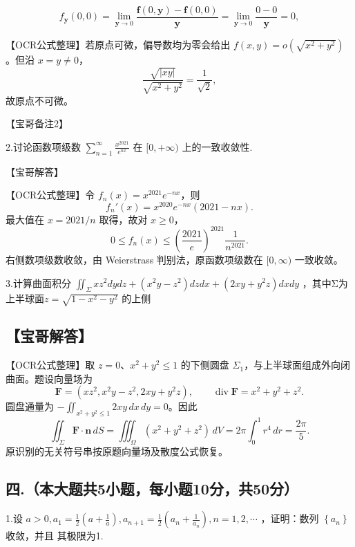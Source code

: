 \documentclass[11pt,fontset=fandol]{ctexart}
\begin{document}
\[
f _ { \boldsymbol { y } } ( 0 , 0 ) = \lim _ { \boldsymbol { y } \to 0 } \frac { \boldsymbol { f } ( 0 , \boldsymbol { y } ) - \boldsymbol { f } ( 0 , 0 ) } { \boldsymbol { y } } = \lim _ { \boldsymbol { y } \to 0 } \frac { 0 - 0 } { \boldsymbol { y } } = 0 ,
\]

【OCR公式整理】若原点可微，偏导数均为零会给出
\(f(x,y)=o(\sqrt{x^2+y^2})\)。但沿 \(x=y\ne0\)， \[
\frac{\sqrt{|xy|}}{\sqrt{x^2+y^2}}=\frac1{\sqrt2},
\] 故原点不可微。

【宝哥备注2】

2.讨论函数项级数
\(\sum _ { n = 1 } ^ { \infty } { \frac { x ^ { 2 0 2 1 } } { e ^ { n x } } }\)
在 \([ 0 , + \infty )\) 上的一致收敛性.

【宝哥解答】

【OCR公式整理】令 \(f_n(x)=x^{2021}e^{-nx}\)，则 \[
f_n'(x)=x^{2020}e^{-nx}(2021-nx).
\] 最大值在 \(x=2021/n\) 取得，故对 \(x\ge0\)， \[
0\le f_n(x)\le\left(\frac{2021}{e}\right)^{2021}\frac1{n^{2021}}.
\] 右侧数项级数收敛，由 Weierstrass 判别法，原函数项级数在
\([0,\infty)\) 一致收敛。

3.计算曲面积分
\(\iint _ { \Sigma } { x z ^ { 2 } d y d z } + ( x ^ { 2 } y - z ^ { 2 } ) d z d x + ( 2 x y + y ^ { 2 } z ) d x d y\)
，其中Σ为上半球面\(z = \sqrt { 1 - x ^ { 2 } - y ^ { 2 } }\) 的上侧

\subsection{【宝哥解答】}\label{ux5b9dux54e5ux89e3ux7b54-3}

【OCR公式整理】取 \(z=0\)、\(x^2+y^2\le1\) 的下侧圆盘
\(\Sigma_1\)，与上半球面组成外向闭曲面。题设向量场为 \[
\mathbf F=(xz^2,x^2y-z^2,2xy+y^2z),\qquad
\operatorname{div}\mathbf F=x^2+y^2+z^2.
\] 圆盘通量为 \(-\iint_{x^2+y^2\le1}2xy\,dx\,dy=0\)。因此 \[
\iint_\Sigma\mathbf F\cdot\mathbf n\,dS
=\iiint_\Omega(x^2+y^2+z^2)\,dV
=2\pi\int_0^1r^4\,dr=\frac{2\pi}{5}.
\] 原识别的无关符号串按原题向量场及散度公式恢复。

\subsection{四.（本大题共5小题，每小题10分，共50分）}\label{ux56db.ux672cux5927ux9898ux51715ux5c0fux9898ux6bcfux5c0fux989810ux5206ux517150ux5206}

1.设
\(a > 0 , a _ { 1 } = \frac { 1 } { 2 } ( a + \frac { 1 } { a } ) , a _ { n + 1 } = \frac { 1 } { 2 } ( a _ { n } + \frac { 1 } { a _ { n } } ) , n = 1 , 2 , \cdots\)
，证明：数列 \(\left\{ a _ { n } \right\}\) 收敛，并且 其极限为1.
\end{document}
